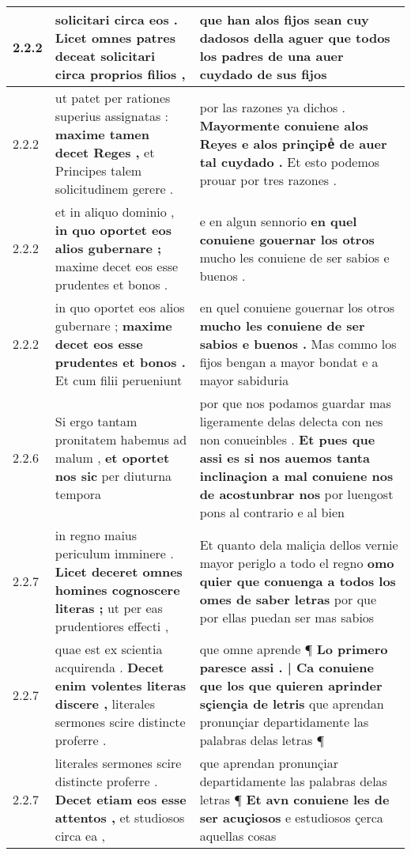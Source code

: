 \begin{tabular}{|p{1cm}|p{6.5cm}|p{6.5cm}|}
2.2.2 & solicitari circa eos . \textbf{ Licet omnes patres deceat solicitari } circa proprios filios , & que han alos fijos sean cuy dadosos della \textbf{ aguer que todos los padres de una } auer cuydado de sus fijos \\\hline
2.2.2 & ut patet per rationes superius assignatas : \textbf{ maxime tamen decet Reges , } et Principes talem solicitudinem gerere . & por las razones ya dichos . \textbf{ Mayormente conuiene alos Reyes e alos prinçipeᷤ de auer tal cuydado . } Et esto podemos prouar por tres razones . \\\hline
2.2.2 & et in aliquo dominio , \textbf{ in quo oportet eos alios gubernare ; } maxime decet eos esse prudentes et bonos . & e en algun sennorio \textbf{ en quel conuiene gouernar los otros } mucho les conuiene de ser sabios e buenos . \\\hline
2.2.2 & in quo oportet eos alios gubernare ; \textbf{ maxime decet eos esse prudentes et bonos . } Et cum filii perueniunt & en quel conuiene gouernar los otros \textbf{ mucho les conuiene de ser sabios e buenos . } Mas commo los fijos bengan a mayor bondat e a mayor sabiduria \\\hline
2.2.6 & Si ergo tantam pronitatem habemus ad malum , \textbf{ et oportet nos sic } per diuturna tempora & por que nos podamos guardar mas ligeramente delas delecta con nes non conueinbles . \textbf{ Et pues que assi es si nos auemos tanta inclinaçion a mal conuiene nos de acostunbrar nos } por luengost pons al contrario e al bien \\\hline
2.2.7 & in regno maius periculum imminere . \textbf{ Licet deceret omnes homines cognoscere literas ; } ut per eas prudentiores effecti , & Et quanto dela maliçia dellos vernie mayor periglo a todo el regno \textbf{ omo quier que conuenga a todos los omes de saber letras } por que por ellas puedan ser mas sabios \\\hline
2.2.7 & quae est ex scientia acquirenda . \textbf{ Decet enim volentes literas discere , } literales sermones scire distincte proferre . & que omne aprende ¶ \textbf{ Lo primero paresce assi . | Ca conuiene que los que quieren aprinder sçiençia de letris } que aprendan pronunçiar departidamente las palabras delas letras ¶ \\\hline
2.2.7 & literales sermones scire distincte proferre . \textbf{ Decet etiam eos esse attentos , } et studiosos circa ea , & que aprendan pronunçiar departidamente las palabras delas letras ¶ \textbf{ Et avn conuiene les de ser acuçiosos } e estudiosos çerca aquellas cosas \\\hline

\end{tabular}
